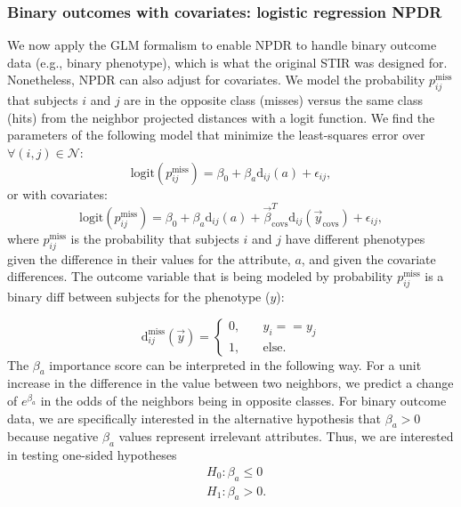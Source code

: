 \documentclass[10pt]{article}
\begin{document}
\subsubsection{Binary outcomes with covariates: logistic regression NPDR}
We now apply the GLM formalism to enable NPDR to handle binary outcome data (e.g., binary phenotype), which is what the original STIR was designed for. Nonetheless, NPDR can also adjust for covariates.
We model the probability $p^{\text{miss}}_{ij}$ that subjects $i$ and $j$ are in the opposite class (misses) versus the same class (hits) from the neighbor projected distances with a logit function. We find the parameters of the following model that minimize the least-squares error over $\forall(i,j) \in \mathcal{N}$:   
\begin{equation}
\text{logit}(p^{\text{miss}}_{ij}) = \beta_0 + \beta_a \text{d}_{ij}(a) + \epsilon_{ij},   
\end{equation}
or with covariates:
\begin{equation}\label{eq:too_logit}
\text{logit}(p^{\text{miss}}_{ij}) = \beta_0 + \beta_a \text{d}_{ij}(a) + \vec{\beta}^{T}_{\text{covs}} \text{d}_{ij}(\vec{y}_{\text{covs}}) + \epsilon_{ij},   
\end{equation}
where $p^{\text{miss}}_{ij}$ is the probability that subjects $i$ and $j$ have different phenotypes given the difference in their values for the attribute, $a$, and given the covariate differences.
The outcome variable that is being modeled by probability $p^{\text{miss}}_{ij}$ is a binary diff between subjects for the phenotype ($y$):
   
\begin{equation}\label{eq:hitdiff}
\text{d}^{\text{miss}}_{ij}(\vec{y}) = \left\{
    \begin{array}{ll}
        0, & \quad  y_{i} == y_{j} \\
        1, & \quad \text{else}.
    \end{array}
\right.
\end{equation}
The $\beta_a$ importance score can be interpreted in the following way. For a unit increase in the difference in the value between two neighbors, we predict a change of $e^{\beta_a}$ in the odds of the neighbors being in opposite classes. For binary outcome data, we are specifically interested in the alternative hypothesis that $\beta_a>0$ because negative $\beta_a$ values represent irrelevant attributes. Thus, we are interested in testing one-sided hypotheses
\begin{equation}
\begin{aligned}
    & H_0: \beta_a \le 0 \\
    & H_1: \beta_a > 0.
\end{aligned}
\end{equation}
\end{document}
